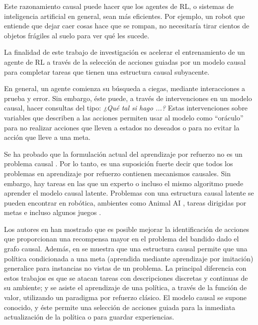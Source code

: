     






Este razonamiento causal puede hacer 
que los agentes de RL, o sistemas de inteligencia artificial en general, 
sean más eficientes.
Por ejemplo, un robot que entiende que dejar caer cosas hace que se rompan, no necesitaría tirar cientos de objetos frágiles al suelo para ver qué les sucede.





La finalidad de este trabajo de investigación es 
acelerar el entrenamiento de un agente de RL
a través de la selección de acciones guiadas por un 
modelo causal para completar tareas que tienen una
estructura causal subyacente.

En general, un agente comienza su búsqueda a ciegas,
mediante interacciones a prueba y error.
Sin embargo, éste puede, a través de intervenciones
en un modelo causal, hacer consultas del tipo: \textit{¿Qué tal si hago ...?} Estas intervenciones sobre variables 
que describen a las acciones permiten usar al modelo
como ``oráculo'' para no realizar acciones que lleven
a estados no deseados o para no evitar la acción que
lleve a una meta.

Se ha probado que la formulación actual del aprendizaje
por refuerzo no es un problema causal \cite{gonzalezsoto2019reinforcement}.
Por lo tanto, es una suposición fuerte 
decir que todos los problemas 
en aprendizaje por refuerzo contienen mecanismos causales. 
Sin embargo, hay tareas en las
que un experto o incluso el mismo algoritmo puede
aprender el modelo causal latente.
Problemas con una estructura causal latente
se pueden encontrar en robótica, ambientes como Animal AI \cite{beyret2019animalai}, 
tareas dirigidas por metas \cite{nair2019causal} e
incluso algunos juegos \cite{madumal2019explainable}.



Los autores en \cite{lattimore2016causal} han mostrado
que es posible mejorar la identificación de acciones que proporcionan una recompensa mayor en
el problema del bandido dado el grafo causal. Además, en \cite{nair2019causal}
se muestra que una estructura causal permite que una política condicionada a una
meta (aprendida mediante aprendizaje por imitación) generalice para instancias no vistas de 
un problema. 
La principal diferencia con estos trabajos es que se atacan tareas con descripciones discretas y continuas de su ambiente; y se asiste el aprendizaje de una política, a través de la función de valor, utilizando un paradigma por refuerzo clásico.
El modelo causal se supone conocido, y éste permite una selección de acciones 
guiada para la inmediata actualización de la política o para guardar experiencias.

